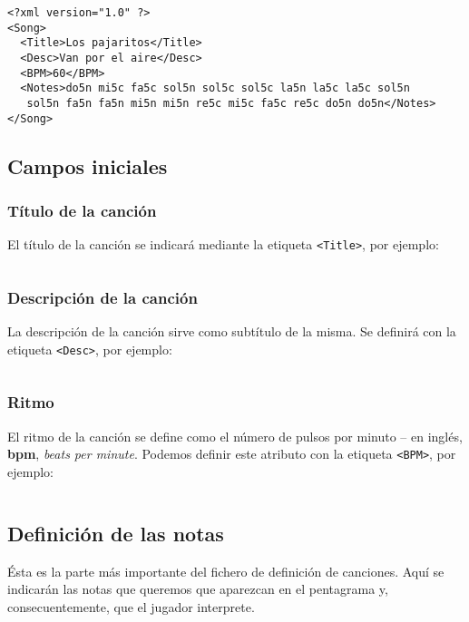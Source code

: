 \begin{verbatim}
<?xml version="1.0" ?>
<Song>
  <Title>Los pajaritos</Title>
  <Desc>Van por el aire</Desc>
  <BPM>60</BPM>
  <Notes>do5n mi5c fa5c sol5n sol5c sol5c la5n la5c la5c sol5n 
   sol5n fa5n fa5n mi5n mi5n re5c mi5c fa5c re5c do5n do5n</Notes>
</Song>
\end{verbatim}

\subsection{Campos iniciales}

\subsubsection{Título de la canción}


El título de la canción se indicará mediante la etiqueta \texttt{<Title>}, por ejemplo:

\inputminted{xml}{apendice_manual_canciones/snippet_1}

\subsubsection{Descripción de la canción}

La descripción de la canción sirve como subtítulo de la misma. Se definirá con
la etiqueta \texttt{<Desc>}, por ejemplo:

\inputminted{xml}{apendice_manual_canciones/snippet_2}

\subsubsection{Ritmo}

El ritmo de la canción se define como el número de pulsos por minuto -- en
inglés, \textbf{bpm}, \textit{beats per minute}. Podemos definir este atributo
con la etiqueta \texttt{<BPM>}, por ejemplo:

\inputminted{xml}{apendice_manual_canciones/snippet_3}

\subsection{Definición de las notas}

Ésta es la parte más importante del fichero de definición de canciones. Aquí se
indicarán las notas que queremos que aparezcan en el pentagrama y,
consecuentemente, que el jugador interprete.

